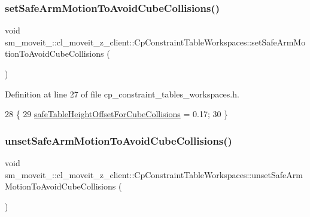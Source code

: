 \subsubsection{\texorpdfstring{set\+Safe\+Arm\+Motion\+To\+Avoid\+Cube\+Collisions()}{setSafeArmMotionToAvoidCubeCollisions()}}
{\footnotesize\ttfamily void sm\+\_\+moveit\+\_\+::cl\+\_\+moveit\+\_\+z\+\_\+client\+::\+Cp\+Constraint\+Table\+Workspaces\+::set\+Safe\+Arm\+Motion\+To\+Avoid\+Cube\+Collisions (\begin{DoxyParamCaption}{ }\end{DoxyParamCaption})\hspace{0.3cm}{\ttfamily [inline]}}



Definition at line 27 of file cp\+\_\+constraint\+\_\+tables\+\_\+workspaces.\+h.


\begin{DoxyCode}
28             \{
29                  \hyperlink{classsm__moveit__4_1_1cl__moveit__z__client_1_1CpConstraintTableWorkspaces_a8c9bd78c8330ae1446e5bc4d2891e285}{safeTableHeightOffsetForCubeCollisions} = 0.17;
30             \}
\end{DoxyCode}
\mbox{\label{classsm__moveit__4_1_1cl__moveit__z__client_1_1CpConstraintTableWorkspaces_a655390e82677d21a5f753924fe10e732}} 
\subsubsection{\texorpdfstring{unset\+Safe\+Arm\+Motion\+To\+Avoid\+Cube\+Collisions()}{unsetSafeArmMotionToAvoidCubeCollisions()}}
{\footnotesize\ttfamily void sm\+\_\+moveit\+\_\+::cl\+\_\+moveit\+\_\+z\+\_\+client\+::\+Cp\+Constraint\+Table\+Workspaces\+::unset\+Safe\+Arm\+Motion\+To\+Avoid\+Cube\+Collisions (\begin{DoxyParamCaption}{ }\end{DoxyParamCaption})\hspace{0.3cm}{\ttfamily [inline]}}




